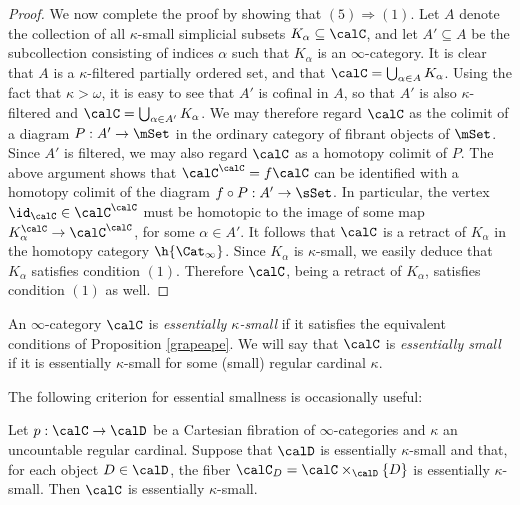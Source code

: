 \begin{proof}
We now complete the proof by showing that $(5) \Rightarrow (1)$. Let $A$ denote the collection
of all $\kappa$-small simplicial subsets $K_{\alpha} \subseteq \calC$, and let $A' \subseteq A$ be the subcollection consisting of indices $\alpha$ such that $K_{\alpha}$ is an $\infty$-category. It is clear that $A$ is a $\kappa$-filtered partially ordered set, and that
$\calC = \bigcup_{ \alpha \in A} K_{\alpha}$. Using the fact that $\kappa > \omega$, it is easy to see that $A'$ is cofinal in $A$, so that $A'$ is also $\kappa$-filtered and $\calC = \bigcup_{ \alpha \in A'} K_{\alpha}$. We may therefore regard $\calC$ as the colimit of a diagram
$P: A' \rightarrow \mSet$ in the ordinary category of fibrant objects of $\mSet$. Since $A'$ is filtered,
we may also regard $\calC$ as a homotopy colimit of $P$. The above argument shows that
$\calC^{\calC} = f \calC$ can be identified with a homotopy colimit of the diagram
$f \circ P: A' \rightarrow \sSet$. In particular, the vertex $\id_{\calC} \in \calC^{\calC}$
must be homotopic to the image of some map $K_{\alpha}^{\calC} \rightarrow \calC^{\calC}$,
for some $\alpha \in A'$. It follows that $\calC$ is a retract of $K_{\alpha}$ in the homotopy category
$\h{\Cat_{\infty}}$. Since $K_{\alpha}$ is $\kappa$-small, we easily deduce that $K_{\alpha}$ satisfies condition $(1)$. Therefore $\calC$, being a retract of $K_{\alpha}$, satisfies condition $(1)$ as well.
\end{proof}

\begin{definition}
An $\infty$-category $\calC$ is {\it essentially $\kappa$-small} if it satisfies the equivalent conditions of Proposition \ref{grapeape}. We will say that $\calC$ is {\it essentially small} if it is essentially $\kappa$-small for some (small) regular cardinal $\kappa$.
\end{definition}

The following criterion for essential smallness is occasionally useful:

\begin{proposition}\label{sumt}
Let $p: \calC \rightarrow \calD$ be a Cartesian fibration of $\infty$-categories and $\kappa$ an uncountable regular cardinal. Suppose that $\calD$ is essentially $\kappa$-small and that, for each
object $D \in \calD$, the fiber $\calC_{D} = \calC \times_{\calD} \{D\}$ is essentially $\kappa$-small. Then $\calC$ is essentially $\kappa$-small.
\end{proposition}

